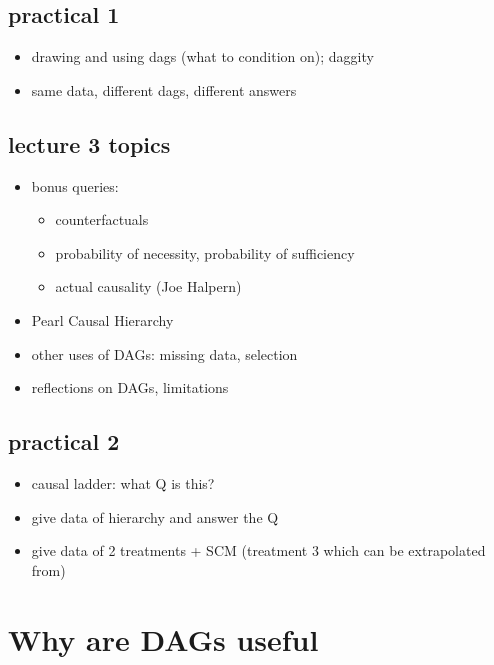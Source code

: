 \documentclass[
  letterpaper,
  DIV=11,
  numbers=noendperiod]{scrartcl}
\providecommand{\tightlist}{%
  \setlength{\itemsep}{0pt}\setlength{\parskip}{0pt}}\usepackage{longtable,booktabs,array}
\begin{document}
\subsection{practical 1}\label{practical-1}

\begin{itemize}
\tightlist
\item
  drawing and using dags (what to condition on); daggity
\item
  same data, different dags, different answers
\end{itemize}

\subsection{lecture 3 topics}\label{lecture-3-topics}

\begin{itemize}
\tightlist
\item
  bonus queries:

  \begin{itemize}
  \tightlist
  \item
    counterfactuals
  \item
    probability of necessity, probability of sufficiency
  \item
    actual causality (Joe Halpern)
  \end{itemize}
\item
  Pearl Causal Hierarchy
\item
  other uses of DAGs: missing data, selection
\item
  reflections on DAGs, limitations
\end{itemize}

\subsection{practical 2}\label{practical-2}

\begin{itemize}
\tightlist
\item
  causal ladder: what Q is this?
\item
  give data of hierarchy and answer the Q
\item
  give data of 2 treatments + SCM (treatment 3 which can be extrapolated
  from)
\end{itemize}

\section{Why are DAGs useful}\label{why-are-dags-useful}
\end{document}
